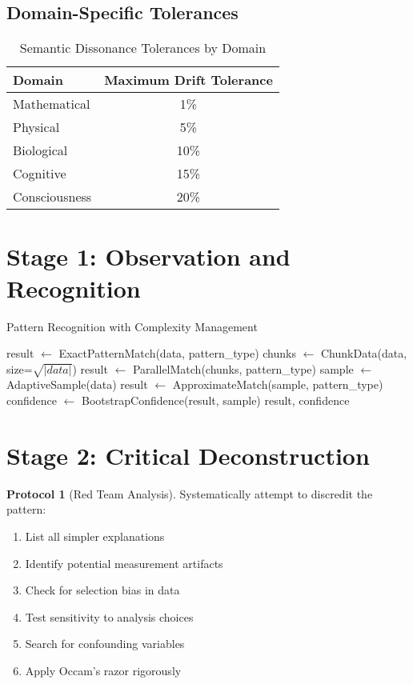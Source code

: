 \documentclass[12pt,oneside]{memoir}
\theoremstyle{plain}
\theoremstyle{definition}
\newtheorem{protocol}[theorem]{Protocol}
\theoremstyle{remark}
\begin{document}
\subsection{Domain-Specific Tolerances}

\begin{table}[h]
\centering
\caption{Semantic Dissonance Tolerances by Domain}
\begin{tabular}{lc}
\toprule
\textbf{Domain} & \textbf{Maximum Drift Tolerance} \\
\midrule
Mathematical & 1\% \\
Physical & 5\% \\
Biological & 10\% \\
Cognitive & 15\% \\
Consciousness & 20\% \\
\bottomrule
\end{tabular}
\end{table}

\section{Stage 1: Observation and Recognition}

\begin{algorithm}
\caption{Pattern Recognition with Complexity Management}
\begin{algorithmic}[1]
        \State result $\gets$ ExactPatternMatch(data, pattern\_type)
        \State chunks $\gets$ ChunkData(data, size=$\sqrt{|data|}$)
        \State result $\gets$ ParallelMatch(chunks, pattern\_type)
    \Else
        \State sample $\gets$ AdaptiveSample(data)
        \State result $\gets$ ApproximateMatch(sample, pattern\_type)
        \State confidence $\gets$ BootstrapConfidence(result, sample)
    \EndIf
    \State \Return result, confidence
\EndProcedure
\end{algorithmic}
\end{algorithm}

\section{Stage 2: Critical Deconstruction}

\begin{protocol}[Red Team Analysis]
Systematically attempt to discredit the pattern:
\begin{enumerate}
\item List all simpler explanations
\item Identify potential measurement artifacts
\item Check for selection bias in data
\item Test sensitivity to analysis choices
\item Search for confounding variables
\item Apply Occam's razor rigorously
\end{enumerate}
\end{protocol}
\end{document}
